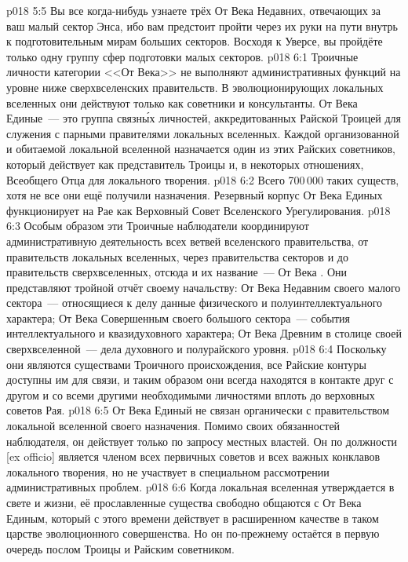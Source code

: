 \vs p018 5:5 Вы все когда\hyp{}нибудь узнаете трёх От Века Недавних, отвечающих за ваш малый сектор Энса, ибо вам предстоит пройти через их руки на пути внутрь к подготовительным мирам больших секторов. Восходя к Уверсе, вы пройдёте только одну группу сфер подготовки малых секторов.
\vs p018 6:1 Троичные личности категории <<От Века>> не выполняют административных функций на уровне ниже сверхвселенских правительств. В эволюционирующих локальных вселенных они действуют только как советники и консультанты. От Века Единые~--- это группа связн\'ых личностей, аккредитованных Райской Троицей для служения с парными правителями локальных вселенных. Каждой организованной и обитаемой локальной вселенной назначается один из этих Райских советников, который действует как представитель Троицы и, в некоторых отношениях, Всеобщего Отца для локального творения.
\vs p018 6:2 Всего 700\,000 таких существ, хотя не все они ещё получили назначения. Резервный корпус От Века Единых функционирует на Рае как Верховный Совет Вселенского Урегулирования.
\vs p018 6:3 Особым образом эти Троичные наблюдатели координируют административную деятельность всех ветвей вселенского правительства, от правительств локальных вселенных, через правительства секторов и до правительств сверхвселенных, отсюда и их название~--- От Века . Они представляют тройной отчёт своему начальству: От Века Недавним своего малого сектора~--- относящиеся к делу данные физического и полуинтеллектуального характера; От Века Совершенным своего большого сектора~--- события интеллектуального и квазидуховного характера; От Века Древним в столице своей сверхвселенной~--- дела духовного и полурайского уровня.
\vs p018 6:4 Поскольку они являются существами Троичного происхождения, все Райские контуры доступны им для связи, и таким образом они всегда находятся в контакте друг с другом и со всеми другими необходимыми личностями вплоть до верховных советов Рая.
\vs p018 6:5 \pc От Века Единый не связан органически с правительством локальной вселенной своего назначения. Помимо своих обязанностей наблюдателя, он действует только по запросу местных властей. Он по должности [ex officio] является членом всех первичных советов и всех важных конклавов локального творения, но не участвует в специальном рассмотрении административных проблем.
\vs p018 6:6 Когда локальная вселенная утверждается в свете и жизни, её прославленные существа свободно общаются с От Века Единым, который с этого времени действует в расширенном качестве в таком царстве эволюционного совершенства. Но он по\hyp{}прежнему остаётся в первую очередь послом Троицы и Райским советником.
